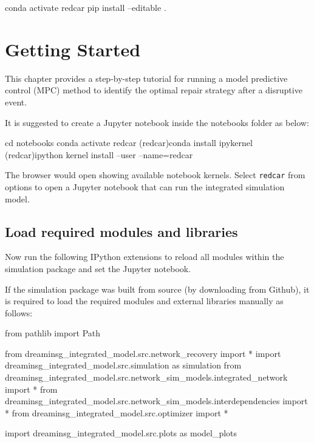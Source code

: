 \documentclass[letterpaper,12pt,english]{sphinxmanual}
\begin{document}
\begin{sphinxVerbatim}[commandchars=\\\{\}]
conda activate redcar
pip install --editable .
\end{sphinxVerbatim}

\chapter{Getting Started}
\label{\detokenize{index:getting-started}}
This chapter provides a step-by-step tutorial for running a model predictive control (MPC) method to identify the optimal repair strategy after a disruptive event. 

It is suggested to create a Jupyter notebook inside the notebooks folder as below:

\begin{sphinxVerbatim}[commandchars=\\\{\}]
cd notebooks	
conda activate redcar
(redcar)conda install ipykernel
(redcar)ipython kernel install --user --name=redcar
\end{sphinxVerbatim}

The browser would open showing available notebook kernels. Select {\tt redcar} from options to open a Jupyter notebook that can run the integrated simulation model.

\section{Load required modules and libraries}
Now run the following IPython extensions to reload all modules within the simulation package and set the Jupyter notebook.


If the simulation package was built from source (by downloading from Github), it is required to load the required modules and external libraries manually as follows:

\begin{sphinxVerbatim}[commandchars=\\\{\}]
from pathlib import Path

from dreaminsg_integrated_model.src.network_recovery import *
import dreaminsg_integrated_model.src.simulation as simulation
from dreaminsg_integrated_model.src.network_sim_models.integrated_network import *
from dreaminsg_integrated_model.src.network_sim_models.interdependencies import *
from dreaminsg_integrated_model.src.optimizer import *

import dreaminsg_integrated_model.src.plots as model_plots
\end{sphinxVerbatim}
\end{document}
